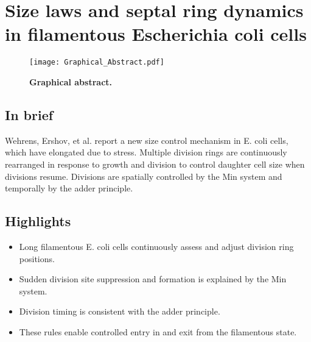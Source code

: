 

\chapter{Size laws and septal ring dynamics in filamentous Escherichia coli cells}
\label{chapter:filarecovery}


\begin{figure}[t]
    \centering
    \texttt{[image: Graphical\_Abstract.pdf]} %
    \caption*{ 
        \centering        
        \textbf{Graphical abstract.}
    }
    \label{fig:filarecovery:graphicalabstract}
\end{figure}

\section*{In brief}
Wehrens, Ershov, et al. report a new size control mechanism in E. coli cells, which have elongated due to stress. Multiple division rings are continuously rearranged in response to growth and division to control daughter cell size when divisions resume. Divisions are spatially controlled by the Min system and temporally by the adder principle.

\section*{Highlights}
\begin{itemize}[itemsep=1pt,parsep=1pt]
    \item Long filamentous E. coli cells continuously assess and adjust division ring positions.
    \item Sudden division site suppression and formation is explained by the Min system.
    \item Division timing is consistent with the adder principle.
    \item These rules enable controlled entry in and exit from the filamentous state.
\end{itemize}

\clearpage

